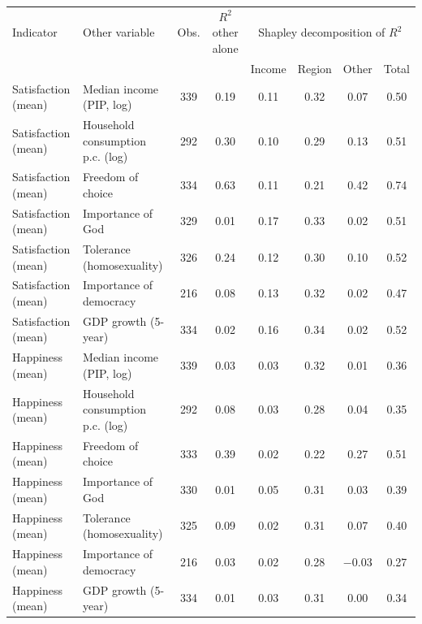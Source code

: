 \begin{tabular}{llcccccc}
\toprule
Indicator & Other variable & Obs. & $R^2$ other alone & \multicolumn{4}{c}{Shapley decomposition of $R^2$} \\ & & & & Income & Region & Other & Total \\
\midrule
Satisfaction (mean) & Median income (PIP, log) & 339 & 0.19 & 0.11 & 0.32 & 0.07 & 0.50 \\
Satisfaction (mean) & Household consumption p.c. (log) & 292 & 0.30 & 0.10 & 0.29 & 0.13 & 0.51 \\
Satisfaction (mean) & Freedom of choice & 334 & 0.63 & 0.11 & 0.21 & 0.42 & 0.74 \\
Satisfaction (mean) & Importance of God & 329 & 0.01 & 0.17 & 0.33 & 0.02 & 0.51 \\
Satisfaction (mean) & Tolerance (homosexuality) & 326 & 0.24 & 0.12 & 0.30 & 0.10 & 0.52 \\
Satisfaction (mean) & Importance of democracy & 216 & 0.08 & 0.13 & 0.32 & 0.02 & 0.47 \\
Satisfaction (mean) & GDP growth (5-year) & 334 & 0.02 & 0.16 & 0.34 & 0.02 & 0.52 \\
\midrule
Happiness (mean) & Median income (PIP, log) & 339 & 0.03 & 0.03 & 0.32 & 0.01 & 0.36 \\
Happiness (mean) & Household consumption p.c. (log) & 292 & 0.08 & 0.03 & 0.28 & 0.04 & 0.35 \\
Happiness (mean) & Freedom of choice & 333 & 0.39 & 0.02 & 0.22 & 0.27 & 0.51 \\
Happiness (mean) & Importance of God & 330 & 0.01 & 0.05 & 0.31 & 0.03 & 0.39 \\
Happiness (mean) & Tolerance (homosexuality) & 325 & 0.09 & 0.02 & 0.31 & 0.07 & 0.40 \\
Happiness (mean) & Importance of democracy & 216 & 0.03 & 0.02 & 0.28 & \ensuremath{-}0.03 & 0.27 \\
Happiness (mean) & GDP growth (5-year) & 334 & 0.01 & 0.03 & 0.31 & 0.00 & 0.34 \\
\bottomrule
\end{tabular}
